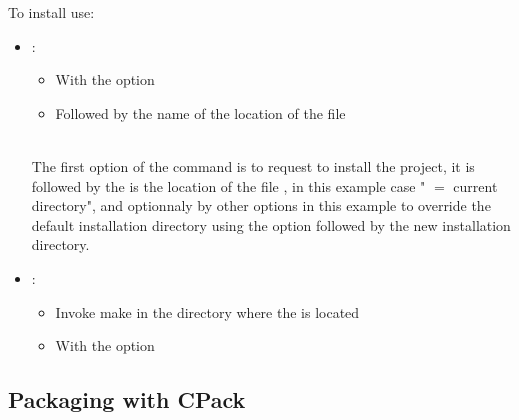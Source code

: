 To install use:
\begin{itemize}
\item {}:
\begin{itemize}
\item With the  option
\item Followed by the name of the location of the file 
\end{itemize}
\vspace{-1cm}
\begin{scripti}
     
\end{scripti}
\\[-0.75cm]
\noindent The first option of the command is to request to install the project, it is followed by the is the location of the file , in this example case " $=$ current directory", and optionnaly by other options in this example to override the default installation directory using the  option followed by the new installation directory. 
\item {}:
\begin{itemize}
\item Invoke make in the directory where the  is located
\item With the  option
\end{itemize}
\vspace{-0.75cm}
\begin{scripti}
   
\end{scripti} 
\end{itemize}
\subsection{Packaging with CPack}

